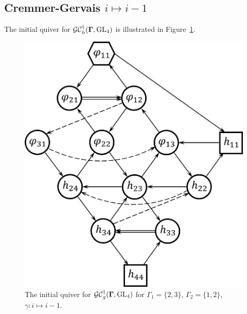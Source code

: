  \subsection{Cremmer-Gervais $i \mapsto i-1$}
The initial quiver for $\mathcal{GC}_h^{\dagger}(\mathbf{\Gamma},\operatorname{GL}_4)$ is illustrated in Figure~\ref{f:n=4_CG_i-i-1}.

\begin{figure}[htb]
\begin{center}
\includegraphics[scale=0.65]{h_convention/h_n=4_CG_i-i-1.png}
\end{center}
\caption{The initial quiver for $\mathcal{GC}^{\dagger}_g(\mathbf{\Gamma},\operatorname{GL}_4)$ for $\Gamma_1 = \{2,3\}$, $\Gamma_2 = \{1,2\}$, $\gamma:i \mapsto i-1$.}
\label{f:n=4_CG_i-i-1}
\end{figure}
 
